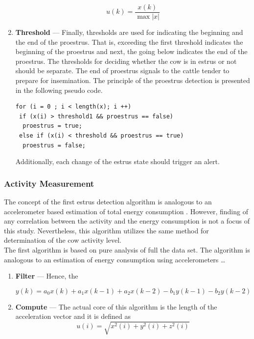 \documentclass[english,12pt,a4paper,pdftex,elec,utf8]{aaltothesis}
\newcommand{\Clanguage}{\lstset{
  language=C++,                %
  basicstyle=\ttfamily,
  title=\lstname,                 %
}}
\begin{document}
\begin{enumerate}
\begin{equation}
u(k) = \frac{x(k)}{\max  \left| x \right|} 
\end{equation}


\item \textbf{Threshold} --- Finally, thresholds are used for indicating the beginning and the end of the proestrus. That is, exceeding the first threshold indicates the beginning of the proestrus and next, the going below indicates the end of the proestrus. The thresholds for deciding whether the cow is in estrus or not should be separate. The end of proestrus signals to the cattle tender to prepare for insemination. The principle of the proestrus detection is presented in the following pseudo code.  \\

\Clanguage
\begin{lstlisting}
for (i = 0 ; i < length(x); i ++)
 if (x(i) > threshold1 && proestrus == false)	
  proestrus = true;
 else if (x(i) < threshold && proestrus == true)
  proestrus = false;	
\end{lstlisting}
Additionally, each change of the estrus state should trigger an alert.


\end{enumerate}


\subsubsection{Activity Measurement} \label{activitymeasurementsection}

The concept of the first estrus detection algorithm is analogous to an accelerometer based estimation of total energy consumption \cite{Kang2012}. However, finding of any correlation between the activity and the energy consumption is not a focus of this study. Nevertheless, this algorithm utilizes the same method for determination of the cow activity level. \\


The first algorithm is based on pure analysis of full the data set. The algorithm is analogous to an estimation of energy consumption using accelerometers   \dots \\



\begin{enumerate}
\item \textbf{Filter} --- Hence, the 

\begin{equation}
y(k) = a_0 x(k) + a_1 x(k-1) + a_2 x(k-2) - b_1 y(k-1) - b_2 y(k-2)
\end{equation}

\item \textbf{Compute} --- The actual core of this algorithm is the length of the acceleration vector and it is defined as \begin{equation}
u(i) = \sqrt{x^2(i) + y^2(i) + z^2(i)} 
\end{equation}

\end{enumerate}
\end{document}
